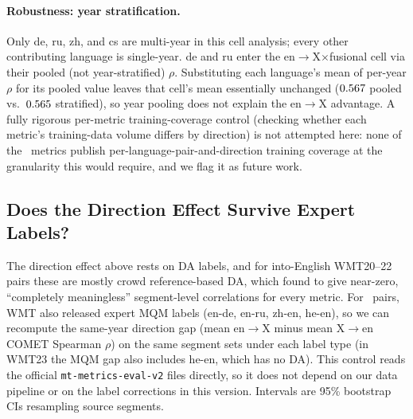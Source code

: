 \documentclass[11pt]{article}
\begin{document}
\paragraph{Robustness: year stratification.} Only de, ru, zh, and cs are multi-year in this cell analysis; every other contributing language is single-year. de and ru enter the en$\to$X$\times$fusional cell via their pooled (not year-stratified) $\rho$. Substituting each language's mean of per-year $\rho$ for its pooled value leaves that cell's mean essentially unchanged ($0.567$ pooled vs.\ $0.565$ stratified), so year pooling does not explain the en$\to$X advantage. A fully rigorous per-metric training-coverage control (checking whether each metric's training-data volume differs by direction) is not attempted here: none of the \NumMetrics\ metrics publish per-language-pair-and-direction training coverage at the granularity this would require, and we flag it as future work.

\subsection{Does the Direction Effect Survive Expert Labels?}
\label{sec:mqm_control}

The direction effect above rests on DA labels, and for into-English WMT20--22 pairs these are mostly crowd reference-based DA, which \citet[App.~B]{freitag2022results} found to give near-zero, ``completely meaningless'' segment-level correlations for every metric. For \MqmCtrlNPairs\ pairs, WMT also released expert MQM labels (en-de, en-ru, zh-en, he-en), so we can recompute the same-year direction gap (mean en$\to$X minus mean X$\to$en COMET Spearman $\rho$) on the same segment sets under each label type (in WMT23 the MQM gap also includes he-en, which has no DA). This control reads the official \texttt{mt-metrics-eval-v2} files directly, so it does not depend on our data pipeline or on the label corrections in this version. Intervals are 95\% bootstrap CIs resampling source segments.
\end{document}
